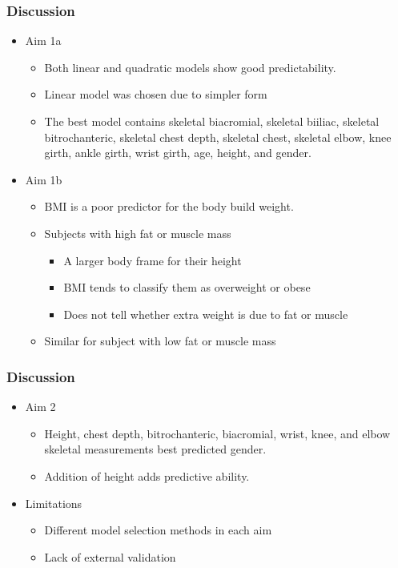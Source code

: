 \documentclass{beamer}
\begin{document}
\begin{frame}
\frametitle{Discussion}

\begin{itemize}
	\item Aim 1a
		\begin{itemize}
			\item Both linear and quadratic models show good predictability. 
			\item Linear model was chosen due to simpler form
			\item The best model contains skeletal biacromial, skeletal biiliac, skeletal bitrochanteric, skeletal chest depth, skeletal chest, skeletal elbow, knee girth, ankle girth, wrist girth, age, height, and gender. 
		\end{itemize}
	
\end{itemize}

\begin{itemize}
	\item Aim 1b
	\begin{itemize}
		\item BMI is a poor predictor for the body build weight.
		\item Subjects with high fat or muscle mass
		\begin{itemize}
			\item A larger body frame for their height
  
			\item BMI tends to classify them as overweight or obese
			\item Does not tell whether extra weight is due to fat or muscle
		\end{itemize}	
		\item Similar for subject with low fat or muscle mass
	\end{itemize}
\end{itemize}

\end{frame}

\begin{frame}
\frametitle{Discussion}

\begin{itemize}
	\item Aim 2
		\begin{itemize}
			\item Height, chest depth, bitrochanteric, biacromial, wrist, knee, and elbow skeletal measurements best predicted gender.
			\item Addition of height adds predictive ability.
		\end{itemize}
\end{itemize}

\begin{itemize}
	\item Limitations
	\begin{itemize}
		\item Different model selection methods in each aim
		\item Lack of external validation 
	\end{itemize}
\end{itemize}

\end{frame}
\end{document}
